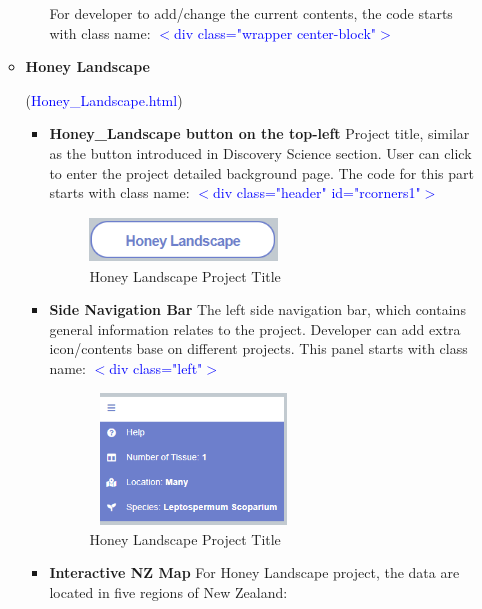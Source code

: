 \documentclass{scrreprt}
\begin{document}
\begin{enumerate}
\begin{itemize}
\begin{itemize}
For developer to add/change the current contents, the code starts with class name: \textcolor{blue}{$<$div class="wrapper center-block"$>$}
\end{itemize}
    \item \begin{large}\textbf{Honey Landscape }\end{large}(\textcolor{blue}{Honey\_Landscape.html})
    \begin{itemize}
        \item \textbf{Honey\_Landscape button on the top-left}
        \newline
        Project title, similar as the button introduced in Discovery Science section. User can click to enter the project detailed background page. The code for this part starts with class name: \textcolor{blue}{$<$div class="header" id="rcorners1"$>$}
    \begin{figure}[h!]
    \centering
    \includegraphics[width=5cm,height=1.2cm]{HLtitle.PNG}
    \caption{Honey Landscape Project Title}
    \label{fig:Start Tour}
\end{figure}
        \item \textbf{Side Navigation Bar}
        \newline
        The left side navigation bar, which contains general information relates to the project. Developer can add extra icon/contents base on different projects. This panel starts with class name: \textcolor{blue}{$<$div class="left"$>$}
         \begin{figure}[h!]
    \centering
    \includegraphics[width=5.5cm,height=3.5cm]{HLsidenav.PNG}
    \caption{Honey Landscape Project Title}
    \label{fig:Start Tour}
\end{figure}
        \item \textbf{Interactive NZ Map}
       \newline
       For Honey Landscape project, the data are located in five regions of New Zealand: 
       \begin{itemize}

\end{itemize}
\end{itemize}
\end{itemize}
\end{enumerate}
\end{document}
